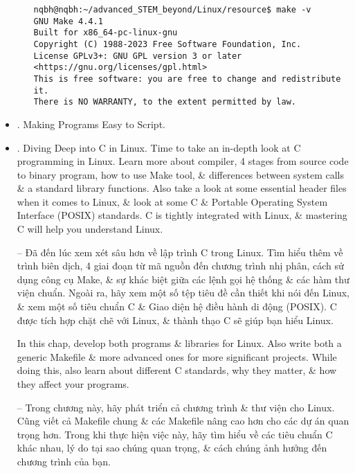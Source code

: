 \documentclass{article}
\begin{document}
\begin{itemize}
\begin{itemize}
\begin{verbatim}
nqbh@nqbh:~/advanced_STEM_beyond/Linux/resource$ make -v
GNU Make 4.4.1
Built for x86_64-pc-linux-gnu
Copyright (C) 1988-2023 Free Software Foundation, Inc.
License GPLv3+: GNU GPL version 3 or later <https://gnu.org/licenses/gpl.html>
This is free software: you are free to change and redistribute it.
There is NO WARRANTY, to the extent permitted by law.
        \end{verbatim}
        
        
    \end{itemize}
    \item {. Making Programs Easy to Script.}
    \item {. Diving Deep into C in Linux.} Time to take an in-depth look at C programming in Linux. Learn more about compiler, 4 stages from source code to binary program, how to use Make tool, \& differences between system calls \& a standard library functions. Also take a look at some essential header files when it comes to Linux, \& look at some C \& Portable Operating System Interface (POSIX) standards. C is tightly integrated with Linux, \& mastering C will help you understand Linux.
    
    -- Đã đến lúc xem xét sâu hơn về lập trình C trong Linux. Tìm hiểu thêm về trình biên dịch, 4 giai đoạn từ mã nguồn đến chương trình nhị phân, cách sử dụng công cụ Make, \& sự khác biệt giữa các lệnh gọi hệ thống \& các hàm thư viện chuẩn. Ngoài ra, hãy xem một số tệp tiêu đề cần thiết khi nói đến Linux, \& xem một số tiêu chuẩn C \& Giao diện hệ điều hành di động (POSIX). C được tích hợp chặt chẽ với Linux, \& thành thạo C sẽ giúp bạn hiểu Linux.
    
    In this chap, develop both programs \& libraries for Linux. Also write both a generic Makefile \& more advanced ones for more significant projects. While doing this, also learn about different C standards, why they matter, \& how they affect your programs.
    
    -- Trong chương này, hãy phát triển cả chương trình \& thư viện cho Linux. Cũng viết cả Makefile chung \& các Makefile nâng cao hơn cho các dự án quan trọng hơn. Trong khi thực hiện việc này, hãy tìm hiểu về các tiêu chuẩn C khác nhau, lý do tại sao chúng quan trọng, \& cách chúng ảnh hưởng đến chương trình của bạn.
    

\end{itemize}
\end{document}
